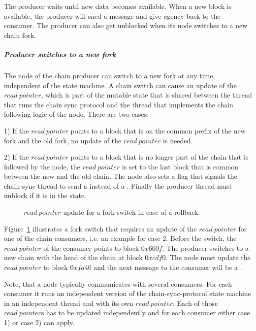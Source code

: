 \documentclass{report}
\theoremstyle{definition}{
  \newtheorem{lemma}{Lemma}[section] %
  \newtheorem{definition}[lemma]{Definition}
}
\theoremstyle{theorem}{
  \newtheorem{invariant}[lemma]{Invariant}
  \newtheorem{proofobligation}[lemma]{Proof Obligation}
}
\numberwithin{equation}{lemma}
\begin{document}
The producer waits until new data becomes available.
When a new block is available, the producer will
sned a \RollForward{} message and give agency back to the consumer.
The producer can also get unblocked when its node switches to a new chain fork.

\subparagraph{Producer switches to a new fork}
The node of the chain producer can switch to a new fork at any time, independent of the
state machine.
A chain switch can cause an update of the $read~pointer$,
which is part of the mutable state that is shared between the thread that runs
the chain sync protocol and the thread that implements the chain following logic of the node.
There are two cases:

1) If the $read~pointer$ points to a block that is on the common prefix of the new
fork and the old fork, no update of the $read~pointer$ is needed.

2) If the $read~pointer$ points to a block that is no longer part of the chain that is followed by the node,
the $read~pointer$ is set to the last block that is common between the new and the old chain.
The node also sets a flag that signals the chain-sync thread to send a \RollBackward{} instead
of a \RollForward.
Finally the producer thread must unblock if it is in the \MustReply{} state.

\begin{figure}[h]
\begin{center}
\end{center}
\caption{$read~pointer$ update for a fork switch in case of a rollback.}
\label{read-pointer-rollback}
\end{figure}

Figure~\ref{read-pointer-rollback} illustrates a fork switch that requires an update of the $read~pointer$
for one of the chain consumers, i.e. an example for case 2.
Before the switch, the $read~pointer$ of the consumer points to block $0x660f$.
The producer switches to a new chain with the head of the chain at block $0xcdf0$.
The node must update the $read~pointer$ to block $0xfa40$ and the next message to the consumer
will be a \RollBackward.

Note, that a node typically communicates with several consumers. For each consumer it runs an independent
version of the chain-sync-protocol state machine in an independent thread and with its own $read~pointer$.
Each of those $read~pointer$s has to be updated independently and for each consumer
either case 1) or case 2) can apply.
\end{document}
